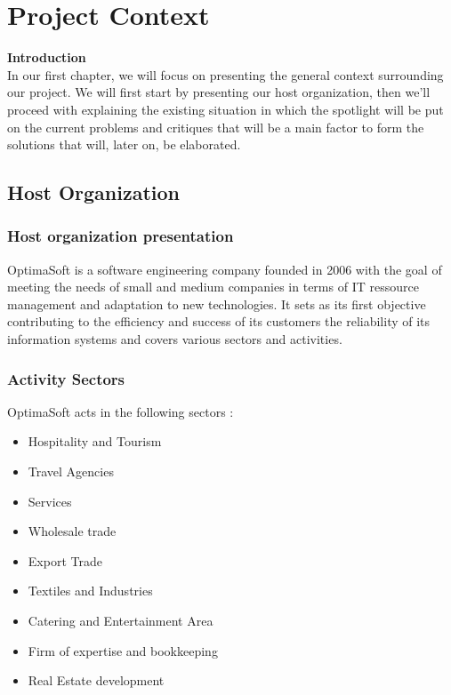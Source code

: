 \documentclass{report}
\begin{document}
\chapter{Project Context}

\textbf{\Large Introduction}
\vspace{30px}
\textnormal{
\\In our first chapter, we will focus on presenting the general context surrounding our project. We will first start by presenting our host organization, then we'll proceed with explaining the existing situation in which the spotlight will be put on the current problems and critiques that will be a main factor to form the solutions that will, later on, be elaborated.}

\section{Host Organization}
\subsection{Host organization presentation}
\textnormal{
OptimaSoft is a software engineering company founded in 2006 with the goal of meeting the needs of small and medium companies in terms of IT ressource management and adaptation to new technologies. It sets as its first objective contributing to the efficiency and success of its customers  the reliability of its information systems and covers various sectors and activities.
}
\subsection{Activity Sectors}
\textnormal{
OptimaSoft acts in the following sectors : 
}
\begin{itemize}
\item [\ding{51}]  Hospitality and Tourism
\item  [\ding{51}]Travel Agencies
\item [\ding{51}]Services
\item [\ding{51}]Wholesale trade
\item [\ding{51}]Export Trade
\item [\ding{51}]Textiles and Industries
\item [\ding{51}]Catering and Entertainment Area
\item [\ding{51}]Firm of expertise and bookkeeping 
\item[\ding{51}] Real Estate development
\end{itemize}
    
\end{document}
